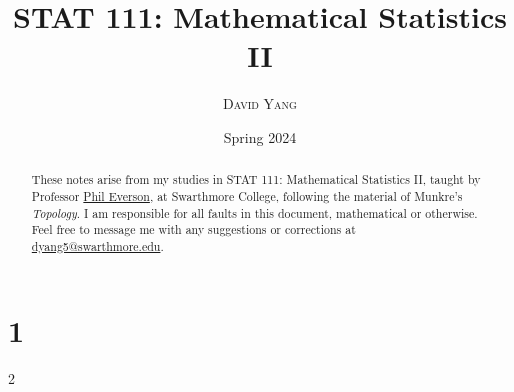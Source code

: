 \documentclass[11pt]{article}
\begin{document}
\title{\LARGE \textbf{STAT 111: Mathematical Statistics II}}
\date{Spring 2024}
\author{\textsc{David Yang}}

\maketitle

\begin{abstract}
These notes arise from my studies in STAT 111: Mathematical Statistics II, taught by 
Professor \href{https://www.swarthmore.edu/NatSci/peverso1/}{Phil Everson}, at Swarthmore College, following the material of Munkre's \textit{Topology}.
I am responsible for all faults in this document, mathematical or otherwise.
Feel free to message me with any suggestions or corrections at \href{mailto:dyang5@swarthmore.edu}{dyang5@swarthmore.edu}.
\end{abstract}

\tableofcontents

\chapter{1}{2}
\end{document}
